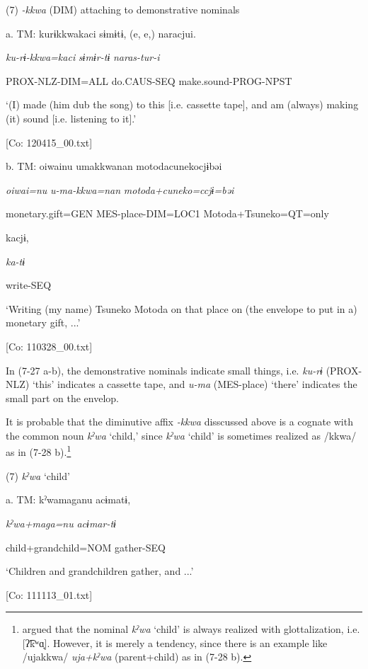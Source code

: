 (7)  \textit{{}-kkwa} (DIM) attaching to demonstrative nominals

  a.  TM:  kurɨkkwakaci  sɨmɨtɨ,  (e, e,)  naracjui.

      \textit{ku-rɨ-kkwa=kaci}  \textit{sɨmɨr-tɨ}    \textit{naras-tur-i}

      PROX-NLZ-DIM=ALL  do.CAUS-SEQ    make.sound-PROG-NPST

      ‘(I) made (him dub the song) to this [i.e. cassette tape], and am (always) making (it) sound [i.e. listening to it].’

      [Co: 120415\_00.txt]

  b.  TM:  {\textbar}oiwai{\textbar}nu  umakkwanan  motodacunekocjɨbəi

      \textit{oiwai=nu}  \textit{u-ma-kkwa=nan}  \textit{motoda+cuneko=ccjɨ=bəi}

      monetary.gift=GEN  MES-place-DIM=LOC1  Motoda+Tsuneko=QT=only

      kacjɨ,    

      \textit{ka-tɨ}    

      write-SEQ    

      ‘Writing (my name) Tsuneko Motoda on that place on (the envelope to put in a) monetary gift, ...’

      [Co: 110328\_00.txt]

In (7-27 a-b), the demonstrative nominals indicate small things, i.e. \textit{ku-rɨ} (PROX-NLZ) ‘this’ indicates a cassette tape, and \textit{u-ma} (MES-place) ‘there’ indicates the small part on the envelop.

  It is probable that the diminutive affix \textit{{}-kkwa} disscussed above is a cognate with the common noun \textit{kˀwa} ‘child,’ since \textit{kˀwa} ‘child’ is sometimes realized as /kkwa/ as in (7-28 b).\footnote{\citet[39]{Niinaga2010} argued that the nominal \textit{kˀwa} ‘child’ is always realized with glottalization, i.e. [ʔ͡kʷɑ̟]. However, it is merely a tendency, since there is an example like /ujakkwa/ \textit{uja+kˀwa} (parent+child) as in (7-28 b).}

(7)  \textit{kˀwa} ‘child’

  a.  TM:  kˀwamaganu  acɨmatɨ,

      \textit{kˀwa+maga=nu}  \textit{acɨmar-tɨ}

      child+grandchild=NOM  gather-SEQ

      ‘Children and grandchildren gather, and ...’

      [Co: 111113\_01.txt]


